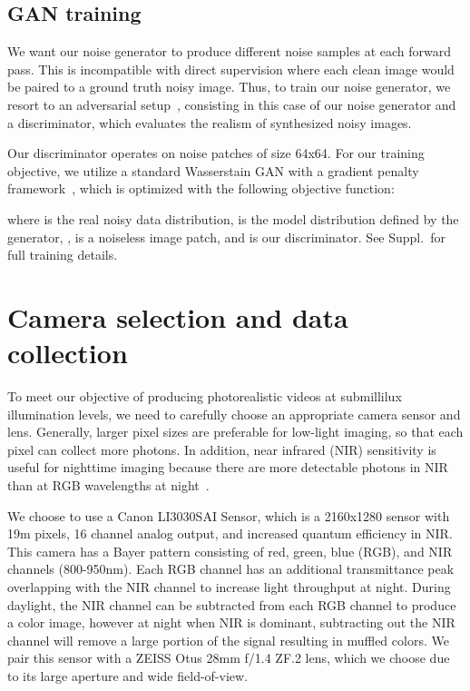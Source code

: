 \documentclass[final]{cvpr}
\begin{document}
\subsection{GAN training}
We want our noise generator to produce different noise samples at each forward pass. This is incompatible with direct supervision where each clean image would be paired to a ground truth noisy image.
Thus, to train our noise generator, we resort to an adversarial setup~\cite{goodfellow2014}, consisting in this case of our noise generator and a discriminator, which evaluates the realism of synthesized noisy images.

Our discriminator operates on noise patches of size 64x64. For our training objective, we utilize a standard Wasserstain GAN with a gradient penalty framework~\cite{gulrajani2017improved}, which is optimized with  the following objective function:

where  is the real noisy data distribution,  is the model distribution defined by the generator, ,  is a noiseless image patch, and  is our discriminator. See Suppl.\ for full training details.













\section{Camera selection and data collection}
\label{sec:camera}
To meet our objective of producing photorealistic videos at submillilux illumination levels, we need to carefully choose an appropriate camera sensor and lens. Generally, larger pixel sizes are preferable for low-light imaging, so that each pixel can collect more photons. In addition, near infrared (NIR) sensitivity is useful for nighttime imaging because there are more detectable photons in NIR than at RGB wavelengths at night~\cite{leinert19981997, vollmerhausen2003night}.

We choose to use a Canon LI3030SAI Sensor, which is a 2160x1280 sensor with 19m pixels, 16 channel analog output, and increased quantum efficiency in NIR. This camera has a Bayer pattern consisting of red, green, blue (RGB), and NIR channels (800-950nm). Each RGB channel has an additional transmittance peak overlapping with the NIR channel to increase light throughput at night. During daylight, the NIR channel can be subtracted from each RGB channel to produce a color image, however at night when NIR is dominant, subtracting out the NIR channel will remove a large portion of the signal resulting in muffled colors. We pair this sensor with a ZEISS Otus 28mm f/1.4 ZF.2 lens, which we choose due to its large aperture and wide field-of-view. 
\end{document}
